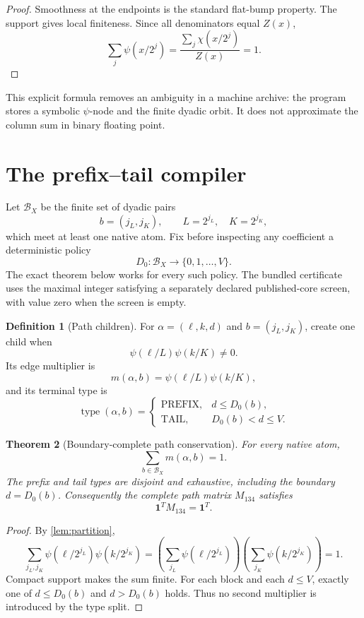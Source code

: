 \documentclass[11pt]{article}
\newtheorem{theorem}{Theorem}[section]
\theoremstyle{definition}
\newtheorem{definition}[theorem]{Definition}
\theoremstyle{remark}
\newcommand{\B}{\mathcal B}
\newcommand{\one}{\mathbf 1}
\begin{document}
\begin{proof}
Smoothness at the endpoints is the standard flat-bump property.  The
support gives local finiteness.  Since all denominators equal \(Z(x)\),
\[
 \sum_j\psi(x/2^j)
 =\frac{\sum_j\chi(x/2^j)}{Z(x)}=1.
\]
\end{proof}

This explicit formula removes an ambiguity in a machine archive:
the program stores a symbolic \(\psi\)-node and the finite dyadic
orbit.  It does not approximate the column sum in binary floating
point.

\section{The prefix--tail compiler}

Let \(\B_X\) be the finite set of dyadic pairs
\[
 b=(j_L,j_K),\qquad L=2^{j_L},\quad K=2^{j_K},
\]
which meet at least one native atom.  Fix before inspecting any
coefficient a deterministic policy
\[
 D_0:\B_X\longrightarrow\{0,1,\ldots,V\}.
\]
The exact theorem below works for every such policy.  The bundled
certificate uses the maximal integer satisfying a separately declared
published-core screen, with value zero when the screen is empty.

\begin{definition}[Path children]
For \(\alpha=(\ell,k,d)\) and \(b=(j_L,j_K)\), create one child when
\[
 \psi(\ell/L)\psi(k/K)\ne0.
\]
Its edge multiplier is
\[
 m(\alpha,b)=\psi(\ell/L)\psi(k/K),
\]
and its terminal type is
\[
 \operatorname{type}(\alpha,b)=
 \begin{cases}
 \mathrm{PREFIX},&d\le D_0(b),\\
 \mathrm{TAIL},&D_0(b)<d\le V.
 \end{cases}
\]
\end{definition}

\begin{theorem}[Boundary-complete path conservation]
\label{thm:archive}
For every native atom,
\[
 \sum_{b\in\B_X}m(\alpha,b)=1.
\]
The prefix and tail types are disjoint and exhaustive, including the
boundary \(d=D_0(b)\).  Consequently the complete path matrix
\(M_{134}\) satisfies
\[
 \boxed{\one^TM_{134}=\one^T.}
\]
\end{theorem}

\begin{proof}
By \cref{lem:partition},
\[
 \sum_{j_L,j_K}
 \psi(\ell/2^{j_L})\psi(k/2^{j_K})
 =
 \left(\sum_{j_L}\psi(\ell/2^{j_L})\right)
 \left(\sum_{j_K}\psi(k/2^{j_K})\right)=1.
\]
Compact support makes the sum finite.  For each block and each
\(d\le V\), exactly one of \(d\le D_0(b)\) and \(d>D_0(b)\) holds.
Thus no second multiplier is introduced by the type split.
\end{proof}
\end{document}
